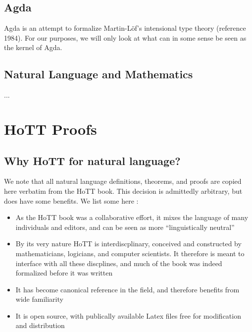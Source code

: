 \documentclass[11pt, a4paper]{article}
\begin{document}





\subsection{Agda}

Agda is an attempt to formalize Martin-Löf's intensional type theory (reference 1984).
For our purposes, we will only look at what can in some sense be seen as the
kernel of Agda.

\subsection{Natural Language and Mathematics}

...

\section{HoTT Proofs}

\subsection{Why HoTT for natural language?}

We note that all natural language definitions, theorems, and proofs are copied
here verbatim from the HoTT book.  This decision is admittedly arbitrary, but
does have some benefits.  We list some here : 

\begin{itemize}[noitemsep]

\item As the HoTT book was a collaborative effort, it mixes the language of
many individuals and editors, and can be seen as more ``linguistically
neutral''

\item By its very nature HoTT is interdiscplinary, conceived and constructed by
mathematicians, logicians, and computer scientists. It therefore is meant to
interface with all these discplines, and much of the book was indeed formalized
before it was written

\item It has become canonical reference in the field, and therefore benefits
from wide familiarity

\item It is open source, with publically available Latex files free for
modification and distribution

\end{itemize}
\end{document}
